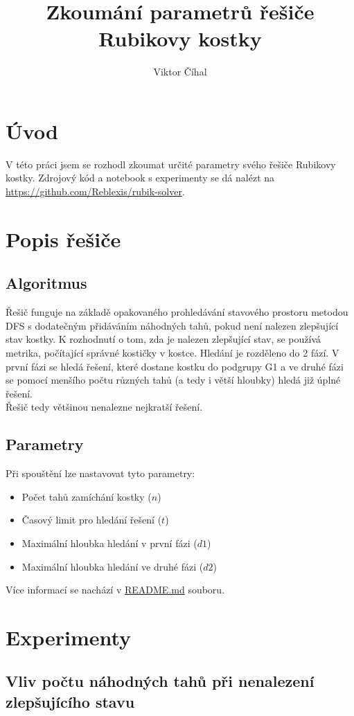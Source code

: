 \documentclass{article}
\title{Zkoumání parametrů řešiče Rubikovy kostky}
\author{Viktor Číhal}
\date{}
\begin{document}
\maketitle
\section*{Úvod}
V této práci jsem se rozhodl zkoumat určité parametry svého řešiče Rubikovy kostky.
Zdrojový kód a notebook s experimenty se dá nalézt na \url{https://github.com/Reblexis/rubik-solver}.

\section*{Popis řešiče}
\subsection*{Algoritmus}
Řešič funguje na základě opakovaného prohledávání stavového prostoru metodou DFS
s dodatečným přidáváním náhodných tahů, pokud není nalezen zlepšující stav kostky.
K rozhodnutí o tom, zda je nalezen zlepšující stav, se používá metrika, počítající
správné kostičky v kostce. Hledání je rozděleno do 2 fází. V první fázi se hledá
řešení, které dostane kostku do podgrupy G1 a ve druhé fázi se pomocí menšího počtu
různých tahů (a tedy i větší hloubky) hledá již úplné řešení.\\
Řešič tedy většinou nenalezne nejkratší řešení.

\subsection*{Parametry}
Při spouštění lze nastavovat tyto parametry:
\begin{itemize}
    \item Počet tahů zamíchání kostky ($n$)
    \item Časový limit pro hledání řešení ($t$)
    \item Maximální hloubka hledání v první fázi ($d1$)
    \item Maximální hloubka hledání ve druhé fázi ($d2$)
\end{itemize}

Více informací se nachází v \href{https://github.com/Reblexis/rubik-solver/blob/main/README.md}{README.md} souboru.

\section*{Experimenty}
\subsection*{Vliv počtu náhodných tahů při nenalezení zlepšujícího stavu}
\end{document}
